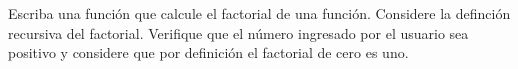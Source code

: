 \begin{code} Escriba una función que calcule el factorial de una
función. Considere la definción recursiva del factorial. Verifique que
el número ingresado por el usuario sea positivo y considere que por
definición el factorial de cero es uno.

\begin{Shaded}
\begin{Highlighting}[]
        \OperatorTok{==}\NormalTok{:}
\OperatorTok{=}
        \NormalTok{:}
\OperatorTok{=}\OperatorTok{*}\OperatorTok{{-}}\NormalTok{)}

\OperatorTok{=} \NormalTok{(}\NormalTok{(}\NormalTok{))}
    \OperatorTok{\textgreater{}=}\NormalTok{:}
\OperatorTok{=}
        \NormalTok{(}\SpecialCharTok{\{}\SpecialCharTok{\}}\SpecialStringTok{! = }\SpecialCharTok{\{}\SpecialCharTok{\}}\SpecialStringTok{\textquotesingle{}}\NormalTok{)}
    \NormalTok{:}
        \NormalTok{(}\NormalTok{)    }

\end{Highlighting}
\end{Shaded}
\end{code}

